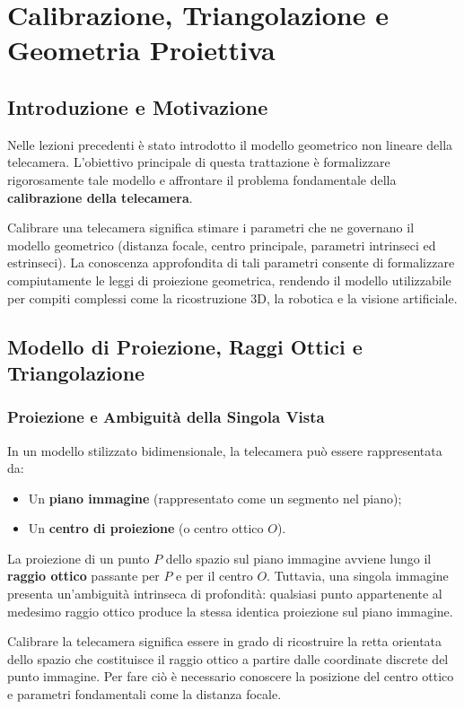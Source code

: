 \chapter{Calibrazione, Triangolazione e Geometria Proiettiva}

\section{Introduzione e Motivazione}
Nelle lezioni precedenti è stato introdotto il modello geometrico non lineare della telecamera. L'obiettivo principale di questa trattazione è formalizzare rigorosamente tale modello e affrontare il problema fondamentale della \textbf{calibrazione della telecamera}.

Calibrare una telecamera significa stimare i parametri che ne governano il modello geometrico (distanza focale, centro principale, parametri intrinseci ed estrinseci). La conoscenza approfondita di tali parametri consente di formalizzare compiutamente le leggi di proiezione geometrica, rendendo il modello utilizzabile per compiti complessi come la ricostruzione 3D, la robotica e la visione artificiale.

\section{Modello di Proiezione, Raggi Ottici e Triangolazione}

\subsection{Proiezione e Ambiguità della Singola Vista}
In un modello stilizzato bidimensionale, la telecamera può essere rappresentata da:
\begin{itemize}
    \item Un \textbf{piano immagine} (rappresentato come un segmento nel piano);
    \item Un \textbf{centro di proiezione} (o centro ottico $O$).
\end{itemize}

La proiezione di un punto $P$ dello spazio sul piano immagine avviene lungo il \textbf{raggio ottico} passante per $P$ e per il centro $O$. Tuttavia, una singola immagine presenta un’ambiguità intrinseca di profondità: qualsiasi punto appartenente al medesimo raggio ottico produce la stessa identica proiezione sul piano immagine.

Calibrare la telecamera significa essere in grado di ricostruire la retta orientata dello spazio che costituisce il raggio ottico a partire dalle coordinate discrete del punto immagine. Per fare ciò è necessario conoscere la posizione del centro ottico e parametri fondamentali come la distanza focale.

